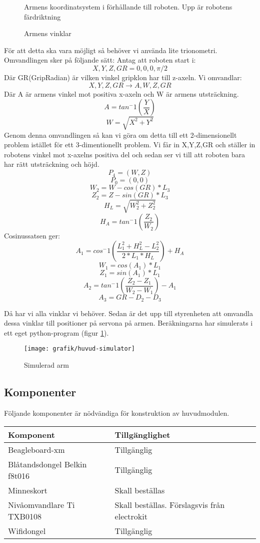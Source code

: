  \begin{figure}[H]
 \centerline{}
 \caption{Armens koordinatsystem i förhållande till roboten. Upp är robotens färdriktning}
 \end{figure}

 \begin{figure}[H]
\centerline{}
\caption{Armens vinklar}
\end{figure}

 För att detta ska vara möjligt så behöver vi använda lite trionometri. Omvandlingen sker på följande sätt:
Antag att roboten start i: $$X,Y,Z,GR=0,0,0,\pi/2$$
Där GR(GripRadian) är vilken vinkel gripklon har till z-axeln.\newline
Vi omvandlar:$$ X,Y,Z,GR\rightarrow A,W,Z,GR$$
Där A är armens vinkel mot positiva x-axeln och W är armens utsträckning.
$$A=tan^-1(\dfrac{Y}{X}) $$
$$W=\sqrt{X^2+Y^2}$$
Genom denna omvandlingen så kan vi göra om detta till ett 2-dimensionellt problem istället för ett 3-dimentionellt problem. Vi får in X,Y,Z,GR och ställer in robotens vinkel mot x-axelns positiva del och sedan ser vi till att roboten bara har rätt utsträckning och höjd.
$$P_4=(W,Z)$$
$$P_0=(0,0)$$
$$W_2=W-cos(GR)*L_3$$
$$Z_2=Z-sin(GR)*L_3$$
$$H_L=\sqrt{W_2^2+Z_2^2}$$
$$H_A=tan^-1(\dfrac{Z_2}{W_2})$$
Cosinussatsen ger:
$$A_1=cos^-1(\dfrac{L_1^2+H_L^2-L_2^2}{2*L_1*H_L})+H_A$$
$$W_1=cos(A_1)*L_1$$
$$Z_1=sin(A_1)*L_1$$
$$A_2=tan^-1(\dfrac{Z_2-Z_1}{W_2-W_1})-A_1$$
$$A_3=GR-D_2-D_3$$

Då har vi alla vinklar vi behöver. Sedan är det upp till styrenheten att omvandla dessa vinklar till positioner på servona på armen.
Beräkningarna har simulerats i ett eget python-program (figur \ref{designspec-huvud-sim-arm}).
\begin{figure}[H]
\center
\texttt{[image: grafik/huvud-simulator]}
\caption{Simulerad arm} \label{designspec-huvud-sim-arm}
\end{figure}

\subsection{Komponenter}
Följande komponenter är nödvändiga för konstruktion av huvudmodulen.\\
\begin{tabularx}{\textwidth}{| l | X |}
	\hline
	{\textbf{Komponent}} & {\textbf{Tillgänglighet}} \\\hline
	{Beagleboard-xm} & {Tillgänglig} \\\hline
	{Blåtandsdongel Belkin f8t016} & {Tillgänglig} \\\hline
	{Minneskort} & {Skall beställas} \\\hline
	{Nivåomvandlare Ti TXB0108} & {Skall beställas. Förslagsvis från electrokit\cite{nivaomvandlare}} \\\hline
	{Wifidongel} & {Tillgänglig} \\\hline
\end{tabularx}
